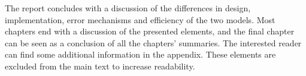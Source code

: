 	The report concludes with a discussion of the differences in design, implementation, error mechanisms and efficiency of the two models. %
	Most chapters end with a discussion of the presented elements, and the final chapter can be seen as a conclusion of all the chapters' summaries.
	The interested reader can find some additional information in the appendix. 
	These elements are excluded from the main text to increase readability.







 
	










